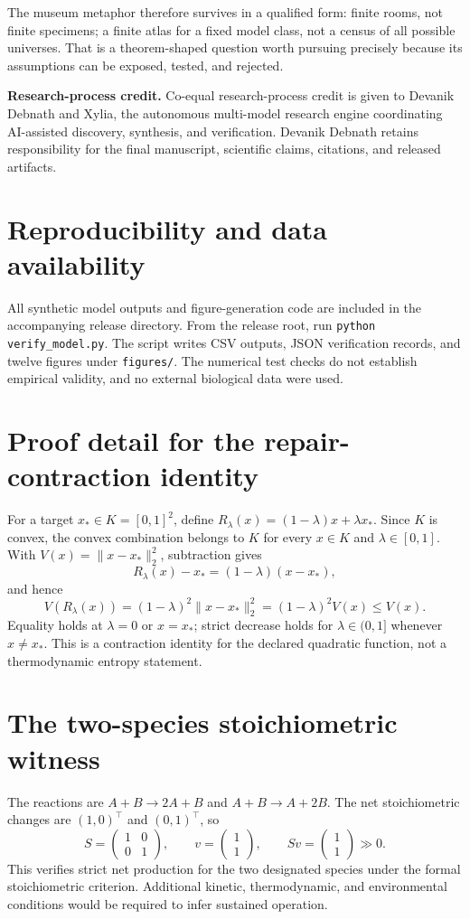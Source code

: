 \documentclass[11pt,a4paper]{article}
\theoremstyle{definition}
\theoremstyle{remark}
\begin{document}
The museum metaphor therefore survives in a qualified form: finite rooms, not finite specimens; a finite atlas for a fixed model class, not a census of all possible universes. That is a theorem-shaped question worth pursuing precisely because its assumptions can be exposed, tested, and rejected.

\vspace{0.5em}
\noindent\textbf{Research-process credit.} Co-equal research-process credit is given to Devanik Debnath and Xylia, the autonomous multi-model research engine coordinating AI-assisted discovery, synthesis, and verification. Devanik Debnath retains responsibility for the final manuscript, scientific claims, citations, and released artifacts.

\section*{Reproducibility and data availability}
All synthetic model outputs and figure-generation code are included in the accompanying release directory. From the release root, run \texttt{python verify\_model.py}. The script writes CSV outputs, JSON verification records, and twelve figures under \texttt{figures/}. The numerical test checks do not establish empirical validity, and no external biological data were used.

\appendix
\section{Proof detail for the repair-contraction identity}
For a target \(x_*\in K=[0,1]^2\), define \(R_\lambda(x)=(1-\lambda)x+\lambda x_*\). Since \(K\) is convex, the convex combination belongs to \(K\) for every \(x\in K\) and \(\lambda\in[0,1]\). With \(V(x)=\|x-x_*\|_2^2\), subtraction gives
\[
R_\lambda(x)-x_*=(1-\lambda)(x-x_*),
\]
and hence
\[
V(R_\lambda(x))=(1-\lambda)^2\|x-x_*\|_2^2=(1-\lambda)^2V(x)\leq V(x).
\]
Equality holds at \(\lambda=0\) or \(x=x_*\); strict decrease holds for \(\lambda\in(0,1]\) whenever \(x\ne x_*\). This is a contraction identity for the declared quadratic function, not a thermodynamic entropy statement.

\section{The two-species stoichiometric witness}
The reactions are \(A+B\to2A+B\) and \(A+B\to A+2B\). The net stoichiometric changes are \((1,0)^\top\) and \((0,1)^\top\), so
\[
S=\begin{pmatrix}1&0\\0&1\end{pmatrix},\qquad v=\begin{pmatrix}1\\1\end{pmatrix},\qquad Sv=\begin{pmatrix}1\\1\end{pmatrix}\gg0.
\]
This verifies strict net production for the two designated species under the formal stoichiometric criterion. Additional kinetic, thermodynamic, and environmental conditions would be required to infer sustained operation.
\end{document}
